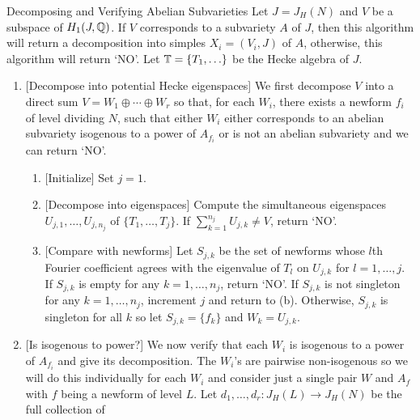 \begin{algorithm}{Decomposing and Verifying Abelian Subvarieties}
    \label{alg:decomp_and_verify_subvarieties}
    Let $J=J_H(N)$ and $V$ be a subspace of $H_1(J, \mathbb{Q})$. If $V$ corresponds
    to a subvariety $A$ of $J$, then this algorithm will return a decomposition
    into simples $X_i=(V_i, J)$ of $A$, otherwise, this algorithm will return
    `NO'. Let $\mathbb{T}=\{T_1,\ldots\}$ be the Hecke algebra of $J$.
    \begin{enumerate}
        \item{} [Decompose into potential Hecke eigenspaces]
            We first decompose $V$ into a direct sum $V=W_1\oplus \cdots \oplus
            W_r$ so that, for each $W_i$, there exists a newform $f_i$ of level
            dividing $N$, such that either $W_i$ either corresponds to an
            abelian subvariety isogenous to a power of $A_{f_i}$ or is not an
            abelian subvariety and we can return `NO'.
            \begin{enumerate}
                \item{} [Initialize]
                    Set $j=1$.
                \item{} [Decompose into eigenspaces]
                    Compute the simultaneous eigenspaces $U_{j,1},\ldots,U_{j,
                    n_j}$ of $\{T_1,\ldots,T_j\}$. If $\sum_{k=1} ^{n_j}
                    U_{j, k}\neq V$, return `NO'.
                \item{} [Compare with newforms]
                    Let $S_{j,k}$ be the set of newforms whose $l$th Fourier
                    coefficient agrees with the eigenvalue of $T_l$ on $U_{j,
                    k}$ for $l=1,\ldots,j$. If $S_{j, k}$ is empty for any
                    $k=1,\ldots,n_j$, return `NO'. If $S_{j,k}$ is not
                    singleton for any $k=1,\ldots, n_j$, increment $j$ and
                    return to (b). Otherwise, $S_{j,k}$ is singleton for all
                    $k$ so let $S_{j,k}=\{f_k\}$ and $W_k=U_{j,k}$.
            \end{enumerate}
        \item{} [Is isogenous to power?]
            We now verify that each $W_i$ is isogenous to a power of $A_{f_i}$
            and give its decomposition. The $W_i$'s are pairwise non-isogenous
            so we will do this individually for each $W_i$ and consider just a
            single pair $W$ and $A_f$ with $f$ being a newform of level $L$.
            Let $d_1,\ldots,d_r:J_H(L)\to J_H(N)$ be the full collection of

\end{enumerate}
\end{algorithm}
